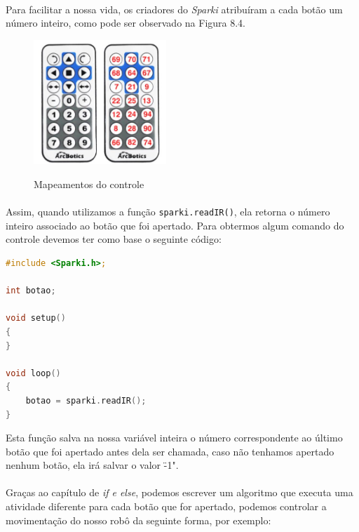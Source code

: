 \paragraph{}
Para facilitar a nossa vida, os criadores do \textit{Sparki} atribuíram a cada botão um número inteiro, como pode ser observado na Figura 8.4.

    \begin{figure}[h]
    \caption{Mapeamentos do controle}
     
    \centering 
    \includegraphics[width=5cm]{Figuras/controle.JPG}
    \label{figura:controle.jpeg}
    \end{figure}
    
\paragraph{}
Assim, quando utilizamos a função \lstinline[columns=fixed]{sparki.readIR()}, ela retorna o número inteiro associado ao botão que foi apertado. Para obtermos algum comando do controle devemos ter como base o seguinte código:

    \begin{lstlisting}[language=C]
#include <Sparki.h>;

int botao;

void setup()
{
}

void loop()
{
    botao = sparki.readIR();
}
\end{lstlisting}
    
Esta função salva na nossa variável inteira o número correspondente ao último botão que foi apertado antes dela ser chamada, caso não tenhamos apertado nenhum botão, ela irá salvar o valor \"-1".

\paragraph{}
Graças ao capítulo de \textit{if e else}, podemos escrever um algoritmo que executa uma atividade diferente para cada botão que for apertado, podemos controlar a movimentação do nosso robô da seguinte forma, por exemplo:

